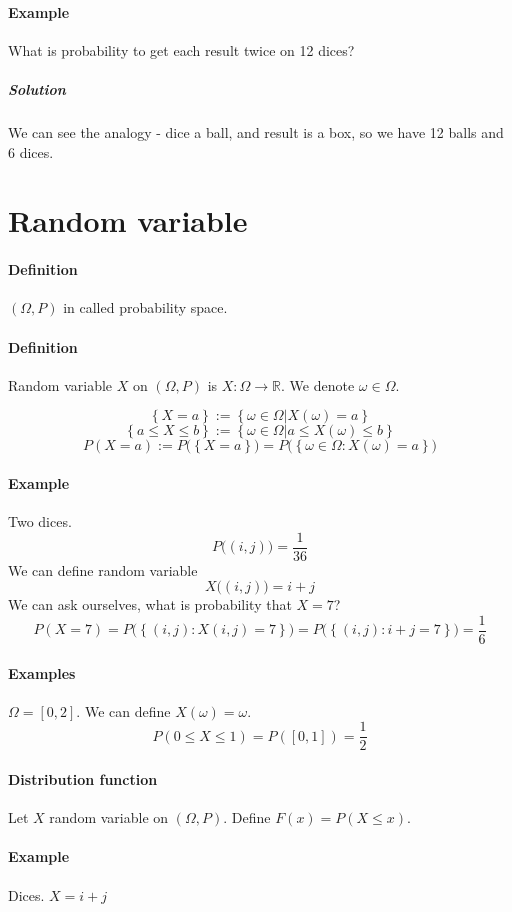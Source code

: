 \paragraph{Example} What is probability to get each result twice on 12 dices?
\subparagraph{Solution}
We can see the analogy - dice a ball, and result is a box, so we have 12 balls and 6 dices.


\section{Random variable}
\paragraph{Definition} $\left( \Omega, P \right)$ in called probability space.
\paragraph{Definition} Random variable $X$ on $\left( \Omega, P \right)$  is $X: \Omega \to \mathbb{R}$. We denote $\omega \in \Omega$.

$$\left\{ X  =a \right\} := \left\{ \omega \in \Omega | X(\omega) = a \right\}$$
$$\left\{a \leq  X  \leq b \right\} := \left\{ \omega \in \Omega | a\leq X(\omega) \leq b \right\}$$
$$P(X=a) := P\bigg( \left\{ X = a \right\} \bigg) = P\bigg( \left\{ \omega \in \Omega : X(\omega) = a \right\} \bigg)$$
\paragraph{Example} Two dices.
$$P\bigg((i,j)\bigg) = \frac{1}{36}$$
We can define random variable
$$X\big( (i,j) \big) = i+j$$
We can ask ourselves, what is probability that $X=7$?
$$P(X=7) = P\bigg( \left\{ (i,j) : X(i,j) = 7 \right\} \bigg) = P\bigg( \left\{ (i,j) : i+j = 7 \right\} \bigg) = \frac{1}{6}$$
\paragraph{Examples} $\Omega = [0,2]$. We can define $X(\omega) = \omega$.
$$P(0\leq X \leq 1) = P([0,1]) = \frac{1}{2}$$

\paragraph{Distribution function}
Let $X$ random variable on $(\Omega, P)$. Define $F(x) = P(X \leq x)$.
\paragraph{Example} Dices. $X=i+j$


